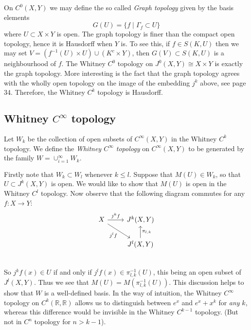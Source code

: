 \documentclass[12pt]{article}
\newcommand{\RR}{\mathbb{R}}
\begin{document}
\begin{remark}
    On $C^0 (X, Y)$ we may define the so called \emph{Graph topology} given by the basis elements
    $$
    G(U) = \{ f \mid \Gamma_f \subset U\}
    $$
    where $U \subset X\times Y$ is open. The graph topology is finer than the compact open topology, hence it is Hausdorff when $Y$ is. To see this, if $f\in S(K, U)$ then we may set $V = \left(f^{-1}(U)\times U\right) \cup \left( K^c \times Y\right)$, then $G(V) \subset S(K, U)$ is a neighbourhood of $f$. The Whitney $C^0$ topology on $J^0(X, Y)\cong X\times Y$ is exactly the graph topology. More interesting is the fact that the graph topology agrees with the wholly open topology on the image of the embedding $j^k$ above, see \cite{UGLYLATEX} page 34. Therefore, the Whitney $C^k$ topology is Hausdorff. \\
\end{remark}

\subsection{Whitney $C^\infty$ topology}

\begin{definition}
    Let $W_k$ be the collection of open subsets of $C^\infty(X, Y)$ in the Whitney $C^k$ topology. We define the \emph{Whitney $C^\infty$ topology} on $C^\infty(X ,Y)$ to be generated by the family $W = \cup_{i=1}^\infty W_k$. \\
\end{definition}

\begin{remark}
    Firstly note that $W_k \subset W_l$ whenever $k \leq l$. Suppose that $M(U) \in W_k$, so that $U \subset J^k(X, Y)$ is open. We would like to show that $M(U)$ is open in the Whitney $C^l$ topology. Now observe that the following diagram commutes for any $f: X\to Y$:
    $$
    \begin{tikzcd}
        X \arrow[r, "j^k f"] \arrow[dr, "j^l f"'] & J^k(X, Y)  \\ 
        & J^l(X, Y) \arrow[u, "\pi_{l, k}"'] \\ 
    \end{tikzcd}
    $$
    So $j^kf (x) \in U$ if and only if $j^l f(x) \in \pi_{l, k}^{-1}(U)$, this being an open subset of $J^l(X, Y)$. Thus we see that $M(U) = M(\pi_{l, k}^{-1}(U))$. This discussion helps to show that $W$ is a well-defined basis. In the way of intuition, the Whitney $C^\infty$ topology on $C^k(\RR, \RR)$ allows us to distinguish between $e^x$ and $e^x + x^k$ for \emph{any} $k$, whereas this difference would be invisible in the Whitney $C^{k-1}$ topology. (But not in $C^n$ topology for $n > k-1$).  \\
\end{remark}
\end{document}
